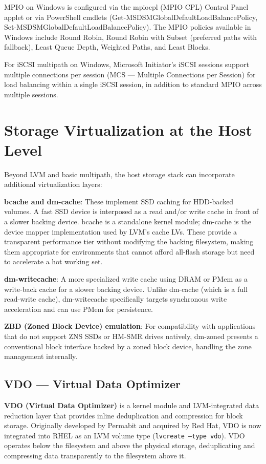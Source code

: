 MPIO on Windows is configured via the mpiocpl (MPIO CPL) Control Panel applet or via PowerShell cmdlets (Get-MSDSMGlobalDefaultLoadBalancePolicy, Set-MSDSMGlobalDefaultLoadBalancePolicy). The MPIO policies available in Windows include Round Robin, Round Robin with Subset (preferred paths with fallback), Least Queue Depth, Weighted Paths, and Least Blocks.

For iSCSI multipath on Windows, Microsoft Initiator's iSCSI sessions support multiple connections per session (MCS --- Multiple Connections per Session) for load balancing within a single iSCSI session, in addition to standard MPIO across multiple sessions.

\section{Storage Virtualization at the Host Level}
Beyond LVM and basic multipath, the host storage stack can incorporate additional virtualization layers:

\textbf{bcache and dm-cache}: These implement SSD caching for HDD-backed volumes. A fast SSD device is interposed as a read and/or write cache in front of a slower backing device. bcache is a standalone kernel module; dm-cache is the device mapper implementation used by LVM's cache LVs. These provide a transparent performance tier without modifying the backing filesystem, making them appropriate for environments that cannot afford all-flash storage but need to accelerate a hot working set.

\textbf{dm-writecache}: A more specialized write cache using DRAM or PMem as a write-back cache for a slower backing device. Unlike dm-cache (which is a full read-write cache), dm-writecache specifically targets synchronous write acceleration and can use PMem for persistence.

\textbf{ZBD (Zoned Block Device) emulation}: For compatibility with applications that do not support ZNS SSDs or HM-SMR drives natively, dm-zoned presents a conventional block interface backed by a zoned block device, handling the zone management internally.


\subsection{VDO --- Virtual Data Optimizer}

\textbf{VDO (Virtual Data Optimizer)} is a kernel module and LVM-integrated data reduction layer that provides inline deduplication and compression for block storage. Originally developed by Permabit and acquired by Red Hat, VDO is now integrated into RHEL as an LVM volume type (\texttt{lvcreate --type vdo}). VDO operates below the filesystem and above the physical storage, deduplicating and compressing data transparently to the filesystem above it.

